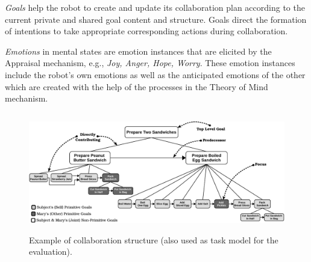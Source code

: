 \documentclass{sig-alternate-05-2015}
\begin{document}

\textit{Goals} help the robot to create and update its collaboration plan
according to the current private and shared goal content and structure. Goals
direct the formation of intentions to take appropriate corresponding actions
during collaboration. 


\textit{Emotions} in mental states are emotion instances that are elicited by
the Appraisal mechanism, e.g., \textit{Joy, Anger, Hope, Worry}. These emotion
instances include the robot's own emotions as well as the anticipated emotions
of the other which are created with the help of the processes in the Theory of
Mind mechanism. \\


\begin{figure}
  \centering
  \vspace*{-5mm}
  \includegraphics[width=14.5cm,height=5.225cm]{figure/taskModel-croped.pdf}
  \vspace*{-3mm}
  \caption{Example of collaboration structure (also used as task model for
  the evaluation).}
  \label{fig:taskModel}
  \vspace*{-5mm}
\end{figure}
\end{document}
